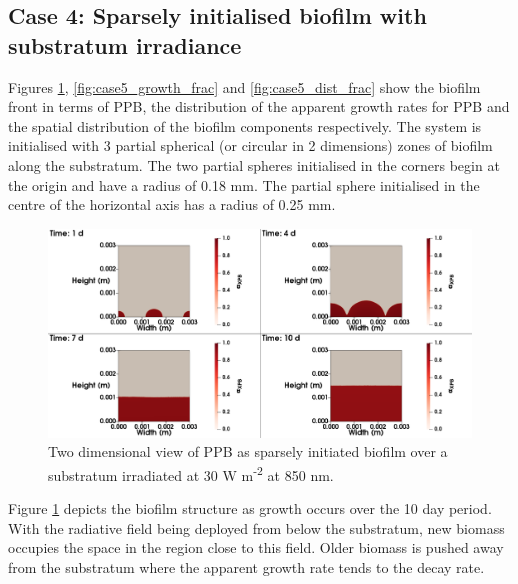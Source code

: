\subsection{Case 4: Sparsely initialised biofilm with substratum irradiance}

Figures \ref{fig:case5_ppb_frac}, \ref{fig:case5_growth_frac} and \ref{fig:case5_dist_frac} show the biofilm front in terms of PPB, the distribution of the apparent growth rates for PPB and the spatial distribution of the biofilm components respectively. The system is initialised with 3 partial  spherical (or circular in 2 dimensions) zones of biofilm along the substratum. The two partial  spheres initialised in the corners begin at the origin and have a radius of 0.18 mm. The partial sphere initialised in the centre of the horizontal axis has a radius of 0.25 mm. 

\begin{figure}[H]
    \centering
     \hspace*{-1cm}\includegraphics[width=1.1\textwidth,height=0.4\textheight]{Chap4/methods/data/figures/case5_ppb_frac.png}
    \caption{Two dimensional view of PPB as sparsely initiated biofilm over a substratum irradiated at 30 W m\textsuperscript{-2} at 850 nm.} 
    \label{fig:case5_ppb_frac}
\end{figure}

Figure \ref{fig:case5_ppb_frac} depicts the biofilm structure as growth occurs over the 10 day period. With the radiative field being deployed from below the substratum, new biomass occupies the space in the region close to this field. Older biomass is pushed away from the substratum where the apparent growth rate tends to the decay rate. 

